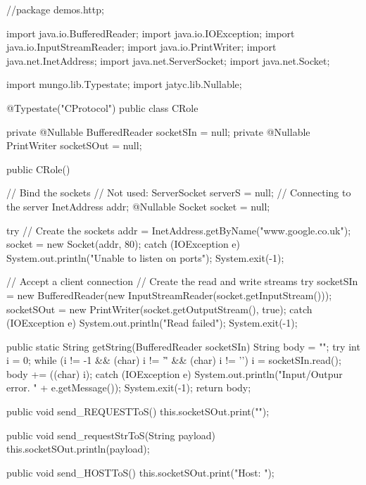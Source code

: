 \begin{code}
//package demos.http;

import java.io.BufferedReader;
import java.io.IOException;
import java.io.InputStreamReader;
import java.io.PrintWriter;
import java.net.InetAddress;
import java.net.ServerSocket;
import java.net.Socket;

import mungo.lib.Typestate;
import jatyc.lib.Nullable;

@Typestate("CProtocol")
public class CRole {
    private @Nullable BufferedReader socketSIn = null;
    private @Nullable PrintWriter socketSOut = null;

    public CRole() {
        // Bind the sockets
        // Not used: ServerSocket serverS = null;
        // Connecting to the server
        InetAddress addr;
        @Nullable Socket socket = null;

        try {// Create the sockets
            addr = InetAddress.getByName("www.google.co.uk");
            socket = new Socket(addr, 80);
        } catch (IOException e) {
            System.out.println("Unable to listen on ports");
            System.exit(-1);
        }

        // Accept a client connection
        // Create the read and write streams
        try {
            socketSIn = new BufferedReader(new InputStreamReader(socket.getInputStream()));
            socketSOut = new PrintWriter(socket.getOutputStream(), true);
        } catch (IOException e) {
            System.out.println("Read failed");
            System.exit(-1);
        }

    }

    public static String getString(BufferedReader socketSIn) {
        String body = "";
        try {
            int i = 0;
            while (i != -1 && (char) i != '\r' && (char) i != '\n') {
                i = socketSIn.read();
                body += ((char) i);
            }
        } catch (IOException e) {
            System.out.println("Input/Outpur error. " + e.getMessage());
            System.exit(-1);
        }
        return body;
    }

    public void send_REQUESTToS() {
        this.socketSOut.print("");
    }

    public void send_requestStrToS(String payload) {
        this.socketSOut.println(payload);
    }

    public void send_HOSTToS() {
        this.socketSOut.print("Host: ");
    }

}
\end{code}
